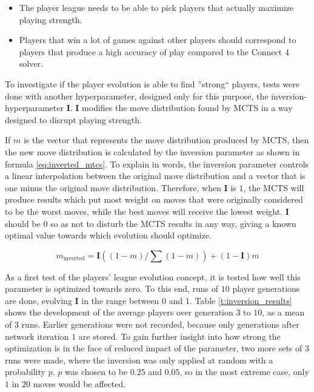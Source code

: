 \documentclass[12pt,onecolumn,oneside,titlepage]{article}
\begin{document}
\begin{itemize}
 \item The player league needs to be able to pick players that actually maximize playing strength.
 \item Players that win a lot of games against other players should correspond to players that produce a high accuracy of play compared to the Connect 4 solver.
\end{itemize}

To investigate if the player evolution is able to find ''strong`` players, tests were done with another hyperparameter, designed only for this purpose, the inversion-hyperparameter $\mathbf{I}$.
$\mathbf{I}$ modifies the move distribution found by MCTS in a way designed to disrupt playing strength.

If $m$ is the vector that represents the move distribution produced by MCTS, then the new move distribution is calculated by the inversion parameter as shown in formula \ref{eq:inverted_mtcs}.
To explain in words, the inversion parameter controls a linear interpolation between the original 
move distribution and a vector that is one minus the original move distribution. Therefore, when $\mathbf{I}$ is $1$, the MCTS will produce results which put most weight on moves that
were originally considered to be the worst moves, while the best moves will receive the lowest weight.
$\mathbf{I}$ should be $0$ so as not to disturb the MCTS results in any way, giving a known optimal value towards which evolution should optimize.

\begin{equation}
 m_\text{inverted} = \mathbf{I}((1 - m) / \sum(1 - m)) + (1 - \mathbf{I}) m \label{eq:inverted_mtcs}
\end{equation}

As a first test of the players' league evolution concept, it is tested how well this parameter is optimized towards zero. 
To this end, runs of $10$ player generations are done, evolving $\mathbf{I}$ in the range between $0$ and $1$.
Table \ref{t:inversion_results} shows the development of the average players over generation $3$ to $10$, as a mean of $3$ runs. Earlier generations were not recorded, because only generations after network iteration $1$ are stored.
To gain further insight into how strong the optimization is in the face of reduced impact of the parameter,
two more sets of $3$ runs were made, where the inversion was only applied at random with a probability $p$. $p$ was chosen to be $0.25$ and $0.05$, so in the most extreme case,
only $1$ in $20$ moves would be affected.
\end{document}
